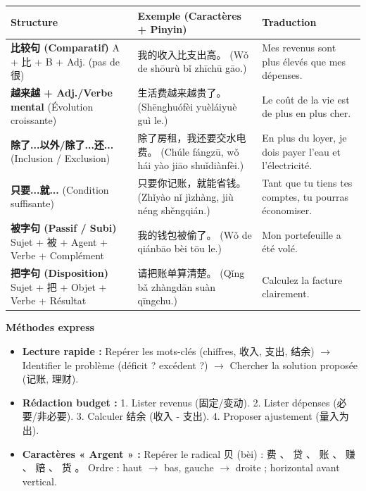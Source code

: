 \documentclass[11pt]{article}
\newcommand{\cle}[1]{{\popxbold\color{popdark}#1}}
\begin{document}
\begin{bilan}
\begin{center}
\begin{tabularx}{\linewidth}{|X|X|X|}
\hline
\rowcolor{poporangeL} \textbf{Structure} & \textbf{Exemple (Caractères + Pinyin)} & \textbf{Traduction} \\ \hline
\textbf{比较句 (Comparatif)} 
A + 比 + B + Adj. (pas de 很) & 我的收入比支出高。 
(Wǒ de shōurù bǐ zhīchū gāo.) & Mes revenus sont plus élevés que mes dépenses. \\ \hline
\textbf{越来越 + Adj./Verbe mental} 
(Évolution croissante) & 生活费越来越贵了。 
(Shēnghuófèi yuèláiyuè guì le.) & Le coût de la vie est de plus en plus cher. \\ \hline
\textbf{除了...以外/除了...还...} 
(Inclusion / Exclusion) & 除了房租，我还要交水电费。 
(Chúle fángzū, wǒ hái yào jiāo shuǐdiànfèi.) & En plus du loyer, je dois payer l'eau et l'électricité. \\ \hline
\textbf{只要...就...} 
(Condition suffisante) & 只要你记账，就能省钱。 
(Zhǐyào nǐ jìzhàng, jiù néng shěngqián.) & Tant que tu tiens tes comptes, tu pourras économiser. \\ \hline
\textbf{被字句 (Passif / Subi)} 
Sujet + 被 + Agent + Verbe + Complément & 我的钱包被偷了。 
(Wǒ de qiánbāo bèi tōu le.) & Mon portefeuille a été volé. \\ \hline
\textbf{把字句 (Disposition)} 
Sujet + 把 + Objet + Verbe + Résultat & 请把账单算清楚。 
(Qǐng bǎ zhàngdān suàn qīngchu.) & Calculez la facture clairement. \\ \hline
\end{tabularx}
\end{center}

\textbf{Méthodes express}
\begin{itemize}
    \item \textbf{Lecture rapide :} Repérer les mots-clés (chiffres, \cle{收入}, \cle{支出}, \cle{结余}) $\rightarrow$ Identifier le problème (déficit ? excédent ?) $\rightarrow$ Chercher la solution proposée (\cle{记账}, \cle{理财}).
    \item \textbf{Rédaction budget :} 1. Lister revenus (固定/变动). 2. Lister dépenses (必要/非必要). 3. Calculer \cle{结余} (收入 - 支出). 4. Proposer ajustement (\cle{量入为出}).
    \item \textbf{Caractères « Argent » :} Repérer le radical \cle{贝} (bèi) : 费 、 贷 、 账 、 赚 、 赔 、 货 。 Ordre : haut $\rightarrow$ bas, gauche $\rightarrow$ droite ; horizontal avant vertical.
\end{itemize}
\end{bilan}
\end{document}
